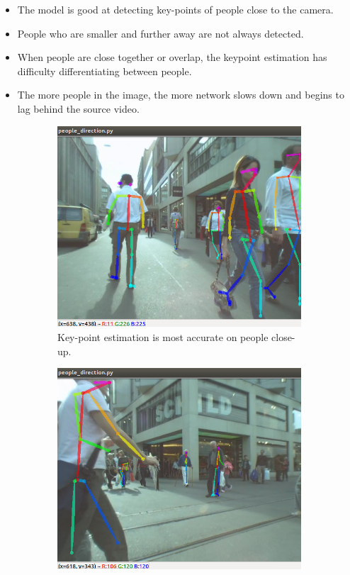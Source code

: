 \begin{itemize}
	\item The model is good at detecting key-points of people close to the camera.
	\item People who are smaller and further away are not always detected.
	\item When people are close together or overlap, the keypoint estimation has difficulty differentiating between people.
	\item The more people in the image, the more network slows down and begins to lag behind the source video.
\end{itemize}

\begin{figure}[ht]
	\begin{subfigure}[b]{.32\textwidth}
		\centering
		\includegraphics[width=1.0\linewidth]{img/chapter5_implementation/openposeKP.png}
		\caption{Key-point estimation is most accurate on people close-up.}
	\end{subfigure}%
	\hspace{\fill} 
	\begin{subfigure}[b]{.32\textwidth}
		\centering
		\includegraphics[width=1.0\linewidth]{img/chapter5_implementation/openposeKP1.png}

\end{subfigure}
\end{figure}
